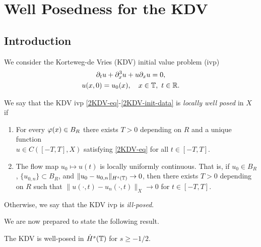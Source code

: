 \chapter{Well Posedness for the KDV}
%
%
%
%
%
\section{Introduction}
We consider the Korteweg-de Vries (KDV) initial value problem (ivp)
%
%
\begin{gather}
	\label{2KDV-eq}
	\partial_t u + \partial_x^{3} u + u \partial_x u = 0,
	\\
	\label{2KDV-init-data}
	u(x,0) = u_0(x), \quad x \in \mathbb{T}, \ t \in \mathbb{R}.
\end{gather}
%
%
%
%
\begin{definition}
	We say that the KDV ivp \eqref{2KDV-eq}-\eqref{2KDV-init-data} is
	\emph{locally well posed} in
	$X$ if 
	\begin{enumerate}
		\item For every $\varphi(x) \in
	B_R$ there exists $T>0$ depending on $R$ and a unique function
	\\
	$u \in C([-T, T],
	X)$ satisfying \eqref{2KDV-eq} for all $t \in [-T, T]$. 
\item The flow map $u_0 \mapsto u(t)$ is locally uniformly continuous. That is, if $u_0
	\in B_R$, $\{u_{0,n}\} \subset B_R$, and 
	$\|u_0 - u_{0, n} \|_{H^{s}(\mathbb{T})} \to 0$, then there exists $T >0$ depending
	on $R$ such that $\|u(\cdot, t) - u_{n}(\cdot,t) \|_{X} \to
	0$ for $t \in [-T, T]$. 
	\end{enumerate}
	Otherwise, we say that the KDV ivp is \emph{ill-posed}.
\end{definition}
%
%
We are now prepared to state the following result.

%
%
%
%
%
%
\begin{theorem}
	\label{2thm:main}
	The KDV is well-posed in $\dot{H}^s(\mathbb{T})$ for $s \ge -1/2$.  
\end{theorem}
%
%
%
%
%
%
%
%
